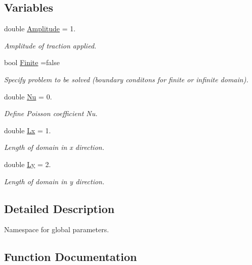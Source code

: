 \subsection*{Variables}
\begin{DoxyCompactItemize}
\item 
double \hyperlink{namespaceGlobal__Parameters_a184a9ddf15137a1b11ccf7dc790d697d}{Amplitude} = 1.
\begin{DoxyCompactList}\small\item\em Amplitude of traction applied. \end{DoxyCompactList}\item 
bool \hyperlink{namespaceGlobal__Parameters_a3a5d4759509036a2650d5efde8e15d56}{Finite} =false
\begin{DoxyCompactList}\small\item\em Specify problem to be solved (boundary conditons for finite or infinite domain). \end{DoxyCompactList}\item 
double \hyperlink{namespaceGlobal__Parameters_a20fccdcfa2c15ad8b951b9ada3bb1661}{Nu} = 0.
\begin{DoxyCompactList}\small\item\em Define Poisson coefficient Nu. \end{DoxyCompactList}\item 
double \hyperlink{namespaceGlobal__Parameters_a8a81b077f0a29b3468c576f56ecb1348}{Lx} = 1.
\begin{DoxyCompactList}\small\item\em Length of domain in x direction. \end{DoxyCompactList}\item 
double \hyperlink{namespaceGlobal__Parameters_a25a31b2de3f05ac457b62fc9fa999872}{Ly} = 2.
\begin{DoxyCompactList}\small\item\em Length of domain in y direction. \end{DoxyCompactList}\end{DoxyCompactItemize}


\subsection{Detailed Description}
Namespace for global parameters. 

\subsection{Function Documentation}
\mbox{\label{namespaceGlobal__Parameters_a397f48e074d2589259ed5c6e4d89f948}} 
